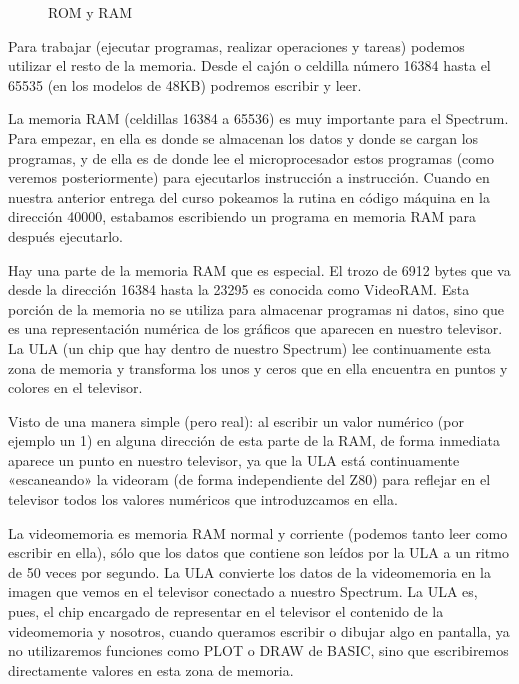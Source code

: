 \documentclass[letterpaper,10pt,spanish]{sphinxmanual}
\begin{document}
\begin{figure}[htbp]
\centering
\capstart

\noindent{}
\caption{ROM y RAM}\label{\detokenize{03_arquitectura/arquitectura:id8}}\end{figure}

Para trabajar (ejecutar programas, realizar operaciones y tareas) podemos utilizar el resto de la memoria. Desde el cajón o celdilla número 16384 hasta el 65535 (en los modelos de 48KB) podremos escribir y leer.

La memoria RAM (celdillas 16384 a 65536) es muy importante para el Spectrum. Para empezar, en ella es donde se almacenan los datos y donde se cargan los programas, y de ella es de donde lee el microprocesador estos programas (como veremos posteriormente) para ejecutarlos instrucción a instrucción. Cuando en nuestra anterior entrega del curso pokeamos la rutina en código máquina en la dirección 40000, estabamos escribiendo un programa en memoria RAM para después ejecutarlo.

Hay una parte de la memoria RAM que es especial. El trozo de 6912 bytes que va desde la dirección 16384 hasta la 23295 es conocida como VideoRAM. Esta porción de la memoria no se utiliza para almacenar programas ni datos, sino que es una representación numérica de los gráficos que aparecen en nuestro televisor. La ULA (un chip que hay dentro de nuestro Spectrum) lee continuamente esta zona de memoria y transforma los unos y ceros que en ella encuentra en puntos y colores en el televisor.

Visto de una manera simple (pero real): al escribir un valor numérico (por ejemplo un 1) en alguna dirección de esta parte de la RAM, de forma inmediata aparece un punto en nuestro televisor, ya que la ULA está continuamente «escaneando» la videoram (de forma independiente del Z80) para reflejar en el televisor todos los valores numéricos que introduzcamos en ella.

La videomemoria es memoria RAM normal y corriente (podemos tanto leer como escribir en ella), sólo que los datos que contiene son leídos por la ULA a un ritmo de 50 veces por segundo. La ULA convierte los datos de la videomemoria en la imagen que vemos en el televisor conectado a nuestro Spectrum. La ULA es, pues, el chip encargado de representar en el televisor el contenido de la videomemoria y nosotros, cuando queramos escribir o dibujar algo en pantalla, ya no utilizaremos funciones como PLOT o DRAW de BASIC, sino que escribiremos directamente valores en esta zona de memoria.
\end{document}
